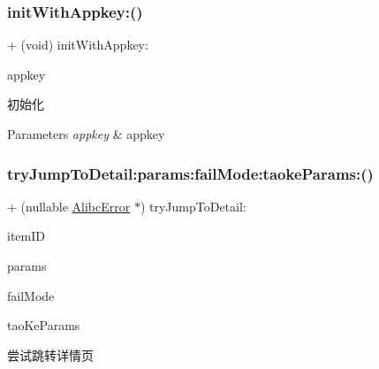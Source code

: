 \subsubsection{\texorpdfstring{init\+With\+Appkey\+:()}{initWithAppkey:()}}
{\footnotesize\ttfamily + (void) init\+With\+Appkey\+: \begin{DoxyParamCaption}\item[{(nonnull N\+S\+String $\ast$)}]{appkey }\end{DoxyParamCaption}}

初始化


\begin{DoxyParams}{Parameters}
{\em appkey} & appkey \\
\hline
\end{DoxyParams}
\mbox{\label{interface_alibc_link_partner_bridge_a8a444eb3726a932f151d5a92f1069282}} 
\subsubsection{\texorpdfstring{try\+Jump\+To\+Detail\+:params\+:fail\+Mode\+:taoke\+Params\+:()}{tryJumpToDetail:params:failMode:taokeParams:()}}
{\footnotesize\ttfamily + (nullable \mbox{\hyperlink{interface_alibc_error}{Alibc\+Error}} $\ast$) try\+Jump\+To\+Detail\+: \begin{DoxyParamCaption}\item[{(N\+S\+String $\ast$)}]{item\+ID }\item[{params:(nullable N\+S\+Dictionary $\ast$)}]{params }\item[{failMode:(Alibc\+Native\+Fail\+Mode)}]{fail\+Mode }\item[{taokeParams:(nullable \mbox{\hyperlink{interface_alibc_trade_taoke_params}{Alibc\+Trade\+Taoke\+Params}} $\ast$)}]{tao\+Ke\+Params }\end{DoxyParamCaption}}

尝试跳转详情页


